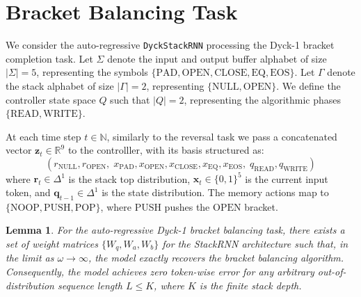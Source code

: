 \documentclass[11pt]{article}
\newtheorem{lemma}{Lemma}
\newcommand{\bm}{\mathbf}
\begin{document}
\section{Bracket Balancing Task}


We consider the auto-regressive \texttt{DyckStackRNN} processing the Dyck-1 bracket completion task. Let $\Sigma$ denote the input and output buffer alphabet of size $|\Sigma| = 5$, representing the symbols $\{\text{PAD}, \text{OPEN}, \text{CLOSE}, \text{EQ}, \text{EOS}\}$. Let $\Gamma$ denote the stack alphabet of size $|\Gamma| = 2$, representing $\{\text{NULL}, \text{OPEN}\}$. We define the controller state space $Q$ such that $|Q| = 2$, representing the algorithmic phases $\{\text{READ}, \text{WRITE}\}$.

At each time step $t \in \mathbb{N}$, similarly to the reversal task we pass a concatenated vector $\bm{z}_t \in \mathbb{R}^9$ to the controlller, with its basis structured as:
\begin{equation}
(r_{\text{NULL}}, r_{\text{OPEN}}, \; x_{\text{PAD}}, x_{\text{OPEN}}, x_{\text{CLOSE}}, x_{\text{EQ}}, x_{\text{EOS}}, \; q_{\text{READ}}, q_{\text{WRITE}})
\end{equation}
where $\bm{r}_t \in \Delta^1$ is the stack top distribution, $\bm{x}_t \in \{0, 1\}^5$ is the current input token, and $\bm{q}_{t-1} \in \Delta^1$ is the state distribution. The memory actions map to $\{\text{NOOP}, \text{PUSH}, \text{POP}\}$, where $\text{PUSH}$ pushes the $\text{OPEN}$ bracket.

\begin{lemma}
For the auto-regressive Dyck-1 bracket balancing task, there exists a set of weight matrices $\{W_q, W_a, W_b\}$ for the StackRNN architecture such that, in the limit as $\omega \to \infty$, the model exactly recovers the bracket balancing algorithm. Consequently, the model achieves zero token-wise error for any arbitrary out-of-distribution sequence length $L \le K$, where $K$ is the finite stack depth.
\end{lemma}
\end{document}
